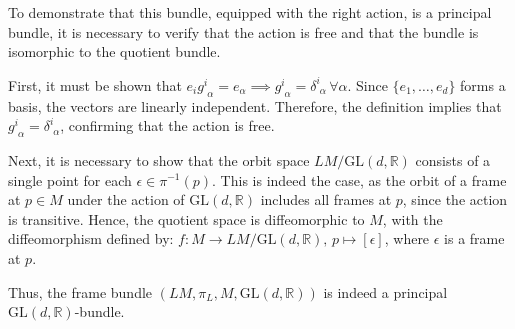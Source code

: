 To demonstrate that this bundle, equipped with the right action, is a principal bundle, it is necessary to verify that the action is free and that the bundle is isomorphic to the quotient bundle.

First, it must be shown that \( e_i g^i_{\,\,\alpha} = e_\alpha \implies g^i_{\,\,\alpha} = \delta^i_{\,\,\alpha} \, \forall \alpha \). Since \( \{e_1, \dots, e_d\} \) forms a basis, the vectors are linearly independent. Therefore, the definition implies that \( g^i_{\,\,\alpha} = \delta^i_{\,\,\alpha} \), confirming that the action is free.

Next, it is necessary to show that the orbit space \( LM/\mathrm{GL}(d,\mathbb{R}) \) consists of a single point for each \( \epsilon \in \pi^{-1}(p) \). This is indeed the case, as the orbit of a frame at \( p \in M \) under the action of \( \mathrm{GL}(d,\mathbb{R}) \) includes all frames at \( p \), since the action is transitive. Hence, the quotient space is diffeomorphic to \( M \), with the diffeomorphism defined by: \( f: M \longrightarrow LM/\mathrm{GL}(d,\mathbb{R}), \, p \mapsto [\epsilon] \), where \( \epsilon \) is a frame at \( p \).

Thus, the frame bundle \( (LM, \pi_L, M, \mathrm{GL}(d,\mathbb{R})) \) is indeed a principal \( \mathrm{GL}(d,\mathbb{R}) \)-bundle.
